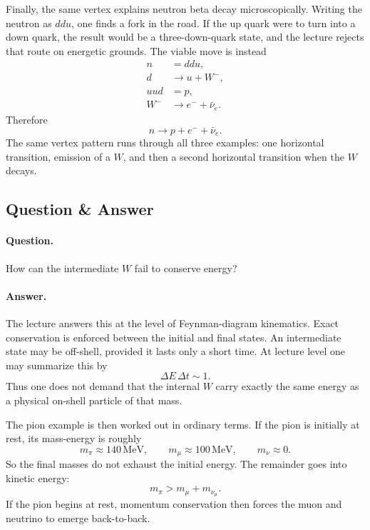 Finally, the same vertex explains neutron beta decay microscopically. Writing the neutron as \(ddu\), one finds a fork in the road. If the up quark were to turn into a down quark, the result would be a three-down-quark state, and the lecture rejects that route on energetic grounds. The viable move is instead
\begin{align}
n &= ddu,\\
d &\to u + W^-,\\
uud &= p,\\
W^- &\to e^- + \bar\nu_e.
\end{align}
Therefore
\begin{equation}
n \to p + e^- + \bar\nu_e.
\end{equation}
The same vertex pattern runs through all three examples: one horizontal transition, emission of a \(W\), and then a second horizontal transition when the \(W\) decays.

\subsection{Question \& Answer}

\paragraph{Question.} How can the intermediate \(W\) fail to conserve energy?

\paragraph{Answer.} The lecture answers this at the level of Feynman-diagram kinematics. Exact conservation is enforced between the initial and final states. An intermediate state may be off-shell, provided it lasts only a short time. At lecture level one may summarize this by
\begin{equation}
\Delta E\,\Delta t \sim 1.
\end{equation}
Thus one does not demand that the internal \(W\) carry exactly the same energy as a physical on-shell particle of that mass.

The pion example is then worked out in ordinary terms. If the pion is initially at rest, its mass-energy is roughly
\begin{equation}
m_\pi \approx 140\,\mathrm{MeV},
\qquad
m_\mu \approx 100\,\mathrm{MeV},
\qquad
m_\nu \approx 0.
\end{equation}
So the final masses do not exhaust the initial energy. The remainder goes into kinetic energy:
\begin{equation}
m_\pi > m_\mu + m_{\nu_\mu}.
\end{equation}
If the pion begins at rest, momentum conservation then forces the muon and neutrino to emerge back-to-back.

